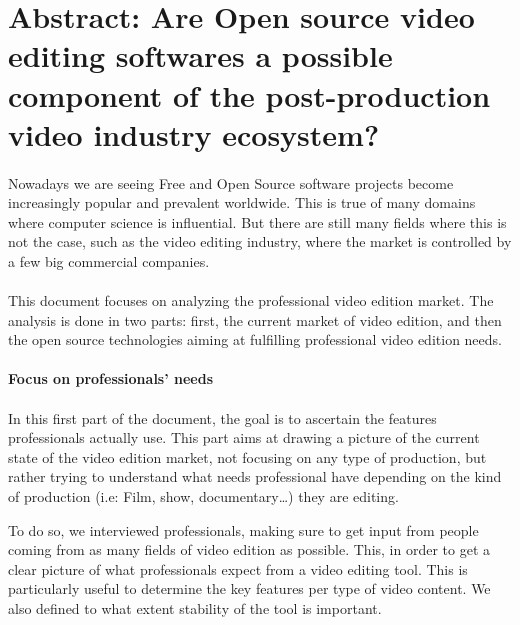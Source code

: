 \newpage\section*{Abstract: Are Open source video editing softwares
a possible component of the post-production video industry ecosystem?}

\paragraph{}

Nowadays we are seeing Free and Open Source software projects become
increasingly popular and prevalent worldwide. This is true of many
domains where computer science is influential. But there are still many
fields where this is not the case, such as the video editing industry,
where the market is controlled by a few big commercial companies.

\paragraph{}

This document focuses on analyzing the professional video edition
market. The analysis is done in two parts: first, the current market of
video edition, and then the open source technologies aiming at fulfilling
professional video edition needs.


\paragraph{Focus on professionals' needs}

\paragraph{}

In this first part of the document, the goal is to ascertain the features
professionals actually use. This part aims at drawing a picture of the
current state of the video edition market, not focusing on any type of
production, but rather trying to understand what needs professional have
depending on the kind of production (i.e: Film, show, documentary\ldots)
they are editing.

To do so, we interviewed professionals, making sure to get input from
people coming from as many fields of video edition as possible. This,
in order to get a clear picture of what professionals expect from a video
editing tool.  This is particularly useful to determine the key features
per type of video content.  We also defined to what extent stability of
the tool is important.

